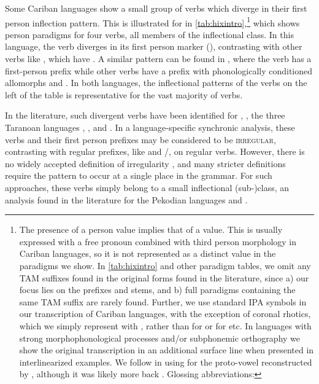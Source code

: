 Some Cariban languages show a small group of verbs which diverge in their first person inflection pattern.
This is illustrated for \hixka in \cref{tab:hixintro},\footnote{The presence of a  person value implies that of a  value.
This is usually expressed with a free pronoun combined with third person morphology in Cariban languages, so it is not represented as a distinct value in the paradigms we show.
In \cref{tab:hixintro} and other paradigm tables, we omit any TAM suffixes found in the original forms found in the literature, since a) our focus lies on the prefixes and stems, and b) full paradigms containing the same TAM suffix are rarely found.
Further, we use standard IPA symbols in our transcription of Cariban languages, with the exception of coronal rhotics, which we simply represent with , rather than  for \wayana or  for \maqui etc.
In languages with strong morphophonological processes and/or subphonemic orthography we show the original transcription in an additional surface line when presented in interlinearized examples.
We follow \textcite{gildea2018reconstructing} in using  for the proto-vowel reconstructed by \textcite{meira2005southern}, although it was likely more back \parencite{gildea2010story}.
Glossing abbreviations: }%
which shows person paradigms for four verbs, all members of the  inflectional class.
In this language, the verb  diverges in its first person marker (), contrasting with other  verbs like , which have .
A similar pattern can be found in \trio, where the verb  has a first-person prefix  while other  verbs have a prefix with phonologically conditioned allomorphs  and  .
In both languages, the inflectional patterns of the verbs on the left of the table is representative for the vast majority of  verbs.

In the literature, such divergent verbs have been identified for \hixka \parencite[188]{hixkaryanaderby1985}, \waiwai \parencite[90]{gildea1998}, the three Taranoan languages \parencite[112--115]{meira1998proto}, \bakairi \parencite{meira2003bakairi}, and \arara \parencite[153]{alves2017arara}.
In a language-specific synchronic analysis, these verbs and their first person prefixes may be considered to be \textsc{irregular}, contrasting with regular prefixes, like \hixka {} and \trio {}/, on regular verbs.
However, there is no widely accepted definition of irregularity \parencite{stolz2012introduction}, and many stricter definitions \parencite[][e.g.]{haspelmath2010understanding} require the pattern to occur at a single place in the grammar.
For such approaches, these verbs simply belong to a small inflectional (sub-)class, an analysis found in the literature for the Pekodian languages \bakairi and \arara \parencites[4]{meira2003bakairi}[149]{alves2017arara}.

